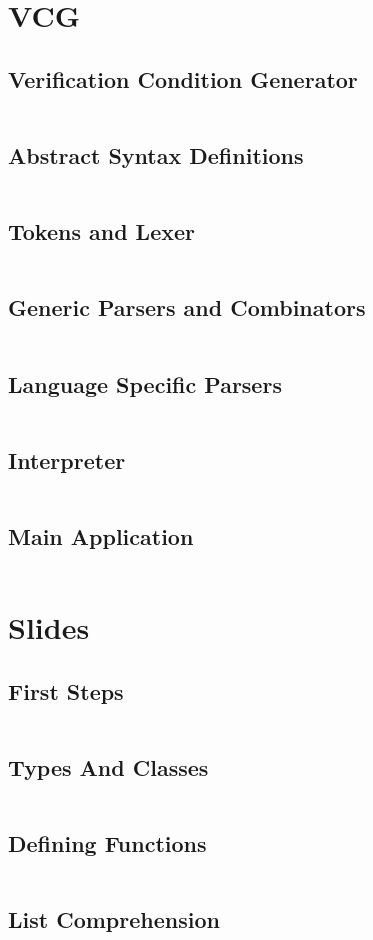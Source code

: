 \documentclass[a4paper,9pt,twoside]{book}
\newcommand{\hsfile}[1]{\inputminted[breaklines]{haskell}{../haskell/#1.hs}}
\begin{document}
\chapter{VCG}
\section{Verification Condition Generator}
\hsfile{vcg/VCG}
\section{Abstract Syntax Definitions}
\hsfile{vcg/AbsSyn}
\section{Tokens and Lexer}
\hsfile{vcg/Scanner}
\section{Generic Parsers and Combinators}
\hsfile{vcg/ParserCombis}
\section{Language Specific Parsers}
\hsfile{vcg/Parser}
\section{Interpreter}
\hsfile{vcg/Interpreter}
\section{Main Application}
\hsfile{vcg/Main}

\chapter{Slides}
\section{First Steps}
\hsfile{slides/1_first_steps}
\section{Types And Classes}
\hsfile{slides/2_types_and_classes}
\section{Defining Functions}
\hsfile{slides/3_defining_functions}
\section{List Comprehension}
\hsfile{slides/4_list_comprehension}
\end{document}
